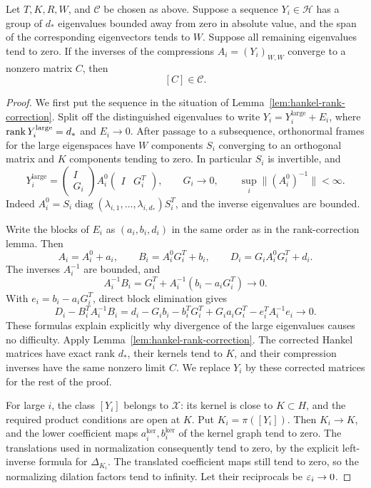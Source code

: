 \begin{lemma}
\label{lem:inverse-limits}
Let $T,K,R,W$, and $\mathcal C$ be chosen as above. Suppose a
sequence $Y_i\in\mathcal H$ has a group of $d_*$ eigenvalues bounded
away from zero in absolute value, and the span of the corresponding
eigenvectors tends to $W$. Suppose all remaining eigenvalues tend
to zero. If the inverses of the compressions $A_i=(Y_i)_{W,W}$
converge to a nonzero matrix $C$, then
\[
 [C]\in\mathcal C.
\]
\end{lemma}

\begin{proof}
We first put the sequence in the situation of
Lemma~\ref{lem:hankel-rank-correction}. Split off the distinguished
eigenvalues to write $Y_i=Y_i^{\mathrm{large}}+E_i$, where
$\operatorname{rank} Y_i^{\mathrm{large}}=d_*$ and $E_i\to0$. After passage to a
subsequence, orthonormal frames for the large eigenspaces have
$W$ components $S_i$ converging to an orthogonal matrix and $K$
components tending to zero. In particular $S_i$ is invertible, and
\begin{equation}
\label{eq:spectral-graph}
 Y_i^{\mathrm{large}}=
 \begin{pmatrix}I\\G_i\end{pmatrix}
 A_i^0
 \begin{pmatrix}I&G_i^T\end{pmatrix},
 \qquad G_i\longrightarrow0,
 \qquad \sup_i\|(A_i^0)^{-1}\|<\infty.
\end{equation}
Indeed $A_i^0=S_i\operatorname{diag}(\lambda_{i,1},\ldots,
\lambda_{i,d_*})S_i^T$, and the inverse eigenvalues are bounded.

Write the blocks of $E_i$ as $(a_i,b_i,d_i)$ in the same order as
in the rank-correction lemma. Then
\[
 A_i=A_i^0+a_i,
 \qquad B_i=A_i^0G_i^T+b_i,
 \qquad D_i=G_iA_i^0G_i^T+d_i.
\]
The inverses $A_i^{-1}$ are bounded, and
\[
 A_i^{-1}B_i=G_i^T+A_i^{-1}(b_i-a_iG_i^T)\longrightarrow0.
\]
With $e_i=b_i-a_iG_i^T$, direct block elimination gives
\[
 D_i-B_i^TA_i^{-1}B_i
 =d_i-G_ib_i-b_i^TG_i^T+G_ia_iG_i^T-e_i^TA_i^{-1}e_i
 \longrightarrow0.
\]
These formulas explain explicitly why divergence of the large
eigenvalues causes no difficulty. Apply
Lemma~\ref{lem:hankel-rank-correction}. The corrected Hankel matrices
have exact rank $d_*$, their kernels tend to $K$, and their
compression inverses have the same nonzero limit $C$. We replace
$Y_i$ by these corrected matrices for the rest of the proof.

For large $i$, the class $[Y_i]$ belongs to $\mathcal X$: its kernel
is close to $K\subset H$, and the required product conditions are
open at $K$. Put $K_i=\pi([Y_i])$. Then $K_i\to K$, and the lower
coefficient maps $a_i^{\mathrm{ker}},b_i^{\mathrm{ker}}$ of the kernel
graph tend to zero.
The translations used in normalization consequently tend to zero,
by the explicit left-inverse formula for $\Delta_{K_i}$. The
translated coefficient maps still tend to zero, so the normalizing
dilation factors tend to infinity. Let their reciprocals be
$\varepsilon_i\to0$.


\end{proof}
